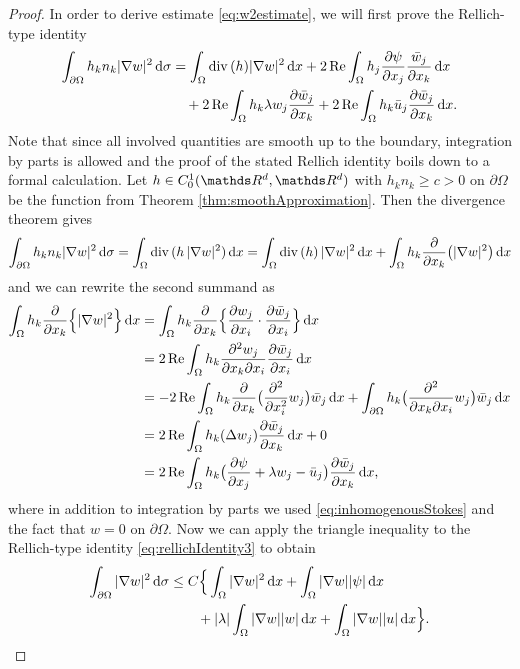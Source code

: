 \begin{proof}
  In order to derive estimate \eqref{eq:w2estimate}, we will first prove the Rellich-type identity
  \begin{align}
    \label{eq:rellichIdentity3}
    \begin{alignedat}{1}
    \int_{\partial\Omega} h_k n_k |\nabla w|^2 \, {\operatorname{d}\!{\sigma}}
    &= \int_\Omega \mathrm{div\,} (h) |\nabla w|^2 \, {\operatorname{d}\!{x}} + 2 \operatorname{Re} \int_{\Omega} h_j \frac{\partial \psi}{\partial x_j} \frac{\bar w_j}{\partial x_k}\, {\operatorname{d}\!{x}}   \\
    &\quad + 2 \operatorname{Re} \int_\Omega h_k \lambda w_j \frac{\partial\bar w_j}{\partial x_k} + 2 \operatorname{Re} \int_\Omega h_k \bar u_j \frac{\partial \bar w_j}{\partial x_k} \, {\operatorname{d}\!{x}}. 
    \end{alignedat}
  \end{align} 
  Note that since all involved quantities are smooth up to the boundary, integration by parts is allowed and the proof of the stated  Rellich identity boils down to a formal calculation.
  Let $h \in C_0^1(\R^d, \R^d)$ with $h_k n_k \geq c > 0$ on $\partial \Omega$ be the function from Theorem \ref{thm:smoothApproximation}.
  Then the divergence theorem gives
  \begin{align*}
    \int_{\partial\Omega} h_k n_k |\nabla w|^2 \, {\operatorname{d}\!{\sigma}}
    = \int_{\Omega} \mathrm{div\,} (h\, |\nabla w|^2) \, {\operatorname{d}\!{x}} 
    = \int_\Omega \mathrm{div\,} (h)\, |\nabla w|^2 \, {\operatorname{d}\!{x}} + \int_\Omega h_k \frac{\partial}{\partial x_k} \big( |\nabla w|^2 \big) \, {\operatorname{d}\!{x}}
  \end{align*}
  and we can rewrite the second summand as
  \begin{align*}
    \int_{\Omega} h_k \frac{\partial}{\partial x_k} \Big\{ |\nabla w|^2 \Big\} \, {\operatorname{d}\!{x}}
    &= \int_{\Omega} h_k \frac{\partial}{\partial x_k} \Big\{ \frac{\partial w_j}{\partial x_i} \cdot \frac{\partial \bar w_j}{\partial x_i}\Big\} \, {\operatorname{d}\!{x}} \\
    &= 2 \operatorname{Re} \int_\Omega h_k \frac{\partial^2 w_j}{\partial x_k \partial x_i} \frac{\partial \bar w_j}{\partial x_i} \, {\operatorname{d}\!{x}} \\
    &= - 2 \operatorname{Re} \int_\Omega h_k \frac{\partial}{\partial x_k} \big( \frac{\partial^2}{\partial x_i^2} w_j \big) \bar w_j \, {\operatorname{d}\!{x}} + \int_{\partial\Omega} h_k \big( \frac{\partial^2}{\partial x_k \partial x_i} w_j \big) \bar w_j \, {\operatorname{d}\!{x}}\\
    &= 2 \operatorname{Re} \int_\Omega h_k ( \Delta w_j ) \frac{\partial \bar w_j}{\partial x_k} \, {\operatorname{d}\!{x}} + 0 \\
    &= 2 \operatorname{Re} \int_\Omega h_k \big( \frac{\partial \psi}{\partial x_j} + \lambda w_j - \bar u_j \big) \frac{\partial \bar w_j}{\partial x_k} \, {\operatorname{d}\!{x}},
  \end{align*}
  where in addition to integration by parts we used \eqref{eq:inhomogenousStokes} and the fact that $w = 0$ on $\partial\Omega$.
  Now we can apply the triangle inequality to the Rellich-type identity \eqref{eq:rellichIdentity3} to obtain
  \begin{align}
    \int_{\partial\Omega} |\nabla w|^2 \, {\operatorname{d}\!{\sigma}} 
    &\leq C \Big\{ \int_\Omega |\nabla w|^2 \, {\operatorname{d}\!{x}} + \int_\Omega |\nabla w | |\psi| \, {\operatorname{d}\!{x}} \nonumber\\
    &\qquad + |\lambda| \int_\Omega |\nabla w| |w| \, {\operatorname{d}\!{x}} + \int_\Omega |\nabla w| |u| \, {\operatorname{d}\!{x}} \Big\}. \label{eq:rellichInequality3}
  \end{align}


\end{proof}
